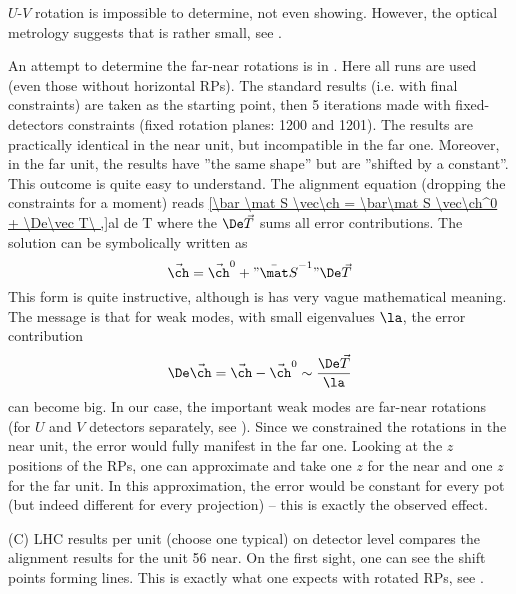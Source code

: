 $U$-$V$ rotation is impossible to determine, not even showing. However, the optical metrology suggests that is rather small, see .

An attempt to determine the far-near rotations is in . Here all runs are used (even those without horizontal RPs). The standard results (i.e. with final constraints) are taken as the starting point, then 5 iterations made with fixed-detectors constraints (fixed rotation planes: 1200 and 1201). The results are practically identical in the near unit, but incompatible in the far one. Moreover, in the far unit, the results have ''the same shape'' but are ''shifted by a constant''. This outcome is quite easy to understand. The alignment equation  (dropping the constraints for a moment) reads
\eqref{\bar \mat S \vec\ch = \bar\mat S \vec\ch^0 + \De\vec T\ ,}{al de T}
where the $\De\vec T$ sums all error contributions. The solution can be symbolically written as
$$\vec\ch = \vec\ch^0 + " {\bar\mat S}^{-1} " \De \vec T$$
This form is quite instructive, although is has very vague mathematical meaning. The message is that for weak modes, with small eigenvalues $\la$, the error contribution
$$\De\vec\ch = \vec\ch - \vec\ch^0 \sim {\De\vec T\over\la}$$
can become big. In our case, the important weak modes are far-near rotations (for $U$ and $V$ detectors separately, see ). Since we constrained the rotations in the near unit, the error would fully manifest in the far one. Looking at the $z$ positions of the RPs, one can approximate and take one $z$ for the near and one $z$ for the far unit. In this approximation, the error would be constant for every pot (but indeed different for every projection) -- this is exactly the observed effect.


\> (C)  LHC results per unit (choose one typical) on detector level
 compares the alignment results for the unit 56 near. On the first sight, one can see the shift points forming lines. This is exactly what one expects with rotated RPs, see . 

